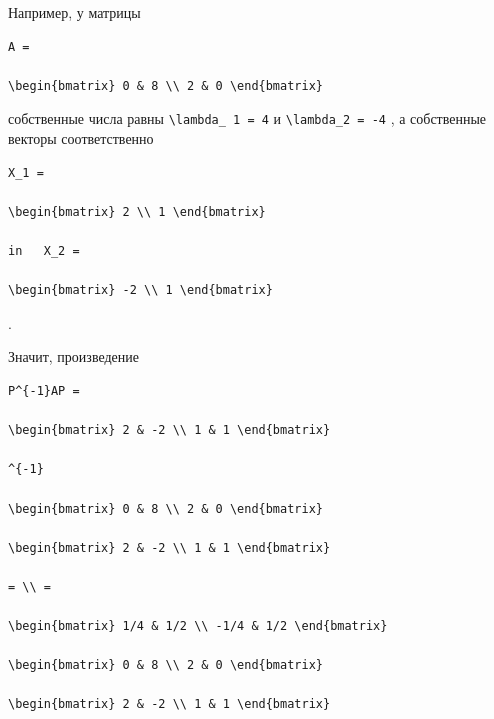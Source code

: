 \documentclass[
  ukrainian,
]{article}
\begin{document}
Например, у матрицы

\begin{verbatim}
A =

\begin{bmatrix} 0 & 8 \\ 2 & 0 \end{bmatrix}
\end{verbatim}

собственные числа равны \texttt{\textbackslash{}lambda\_\ 1\ =\ 4} и
\texttt{\textbackslash{}lambda\_2\ =\ -4} , а собственные векторы
соответственно

\begin{verbatim}
X_1 =

\begin{bmatrix} 2 \\ 1 \end{bmatrix}

in   X_2 =

\begin{bmatrix} -2 \\ 1 \end{bmatrix}
\end{verbatim}

.

Значит, произведение

\begin{verbatim}
P^{-1}AP =

\begin{bmatrix} 2 & -2 \\ 1 & 1 \end{bmatrix}

^{-1}

\begin{bmatrix} 0 & 8 \\ 2 & 0 \end{bmatrix}

\begin{bmatrix} 2 & -2 \\ 1 & 1 \end{bmatrix}

= \\ =

\begin{bmatrix} 1/4 & 1/2 \\ -1/4 & 1/2 \end{bmatrix}

\begin{bmatrix} 0 & 8 \\ 2 & 0 \end{bmatrix}

\begin{bmatrix} 2 & -2 \\ 1 & 1 \end{bmatrix}
\end{verbatim}
\end{document}
